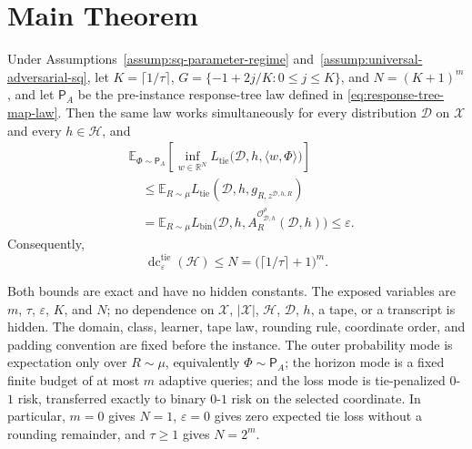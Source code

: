 \section{Main Theorem}\label{sec:main-theorem}

\begin{theorem}
\label{thm:main}
Under Assumptions~\ref{assump:sq-parameter-regime}
and~\ref{assump:universal-adversarial-sq}, let
\(K=\lceil1/\tau\rceil\),
\(G=\{-1+2j/K:0\le j\le K\}\), and
\(N=(K+1)^m\), and let \(\mathsf P_A\) be the pre-instance response-tree
law defined in \eqref{eq:response-tree-map-law}.  Then the same law works
simultaneously for every distribution \(\mathcal D\) on \(\mathcal X\)
and every \(h\in\mathcal H\), and
\[
\begin{aligned}
&\mathbb E_{\Phi\sim\mathsf P_A}
\left[
\inf_{w\in\mathbb R^N}
L_{\mathrm{tie}}\bigl(\mathcal D,h,\langle w,\Phi\rangle\bigr)
\right]\\
&\quad\le
\mathbb E_{R\sim\mu}
L_{\mathrm{tie}}(\mathcal D,h,g_{R,z^{\mathcal D,h,R}})\\
&\quad=
\mathbb E_{R\sim\mu}
L_{\mathrm{bin}}\bigl(
\mathcal D,h,
A_R^{\mathcal O^\rho_{\mathcal D,h}}(\mathcal D,h)
\bigr)
\le\varepsilon.
\end{aligned}
\tag{11}\label{eq:main-risk-chain}
\]
Consequently,
\[
\operatorname{dc}^{\mathrm{tie}}_\varepsilon(\mathcal H)
\le N
=\bigl(\lceil1/\tau\rceil+1\bigr)^m.
\tag{12}\label{eq:main-dimension-bound}
\]

Both bounds are exact and have no hidden constants.  The exposed variables
are \(m\), \(\tau\), \(\varepsilon\), \(K\), and \(N\); no dependence on
\(\mathcal X\), \(|\mathcal X|\), \(\mathcal H\), \(\mathcal D\),
\(h\), a tape, or a transcript is hidden.  The domain, class, learner,
tape law, rounding rule, coordinate order, and padding convention are fixed
before the instance.  The outer probability mode is expectation only over
\(R\sim\mu\), equivalently \(\Phi\sim\mathsf P_A\); the horizon mode is a
fixed finite budget of at most \(m\) adaptive queries; and the loss mode is
tie-penalized \(0\)-\(1\) risk, transferred exactly to binary \(0\)-\(1\)
risk on the selected coordinate.  In particular, \(m=0\) gives \(N=1\),
\(\varepsilon=0\) gives zero expected tie loss without a rounding
remainder, and \(\tau\ge1\) gives \(N=2^m\).
\end{theorem}
